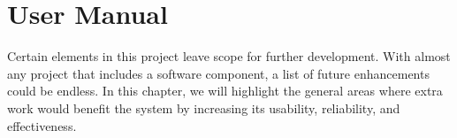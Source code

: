 \chapter{User Manual} 
\label{appendix}


Certain elements in this project leave scope for further development. With almost any project that includes a software component, a list of future enhancements could be endless. In this chapter, we will highlight the general areas where extra work would benefit the system by increasing its usability, reliability, and effectiveness.





